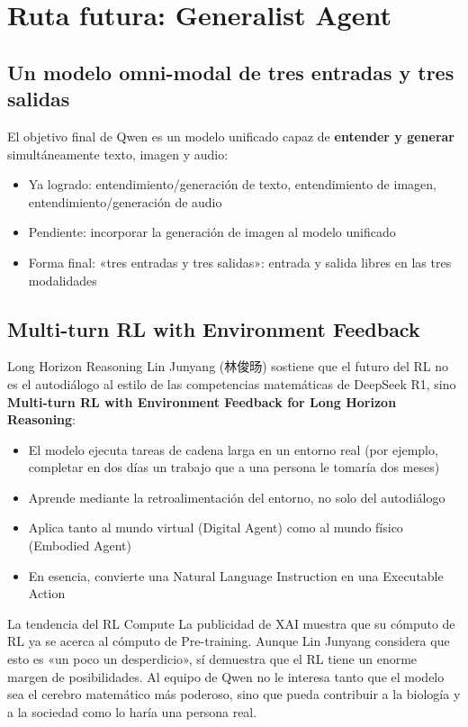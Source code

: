 \section{Ruta futura: Generalist Agent}

\subsection{Un modelo omni-modal de tres entradas y tres salidas}

El objetivo final de Qwen es un modelo unificado capaz de \textbf{entender y generar} simultáneamente texto, imagen y audio:

\begin{itemize}
    \item Ya logrado: entendimiento/generación de texto, entendimiento de imagen, entendimiento/generación de audio
    \item Pendiente: incorporar la generación de imagen al modelo unificado
    \item Forma final: «tres entradas y tres salidas»: entrada y salida libres en las tres modalidades
\end{itemize}

\subsection{Multi-turn RL with Environment Feedback}

\begin{importantbox}{Long Horizon Reasoning}
Lin Junyang (林俊旸) sostiene que el futuro del RL no es el autodiálogo al estilo de las competencias matemáticas de DeepSeek R1, sino \textbf{Multi-turn RL with Environment Feedback for Long Horizon Reasoning}:
\begin{itemize}
    \item El modelo ejecuta tareas de cadena larga en un entorno real (por ejemplo, completar en dos días un trabajo que a una persona le tomaría dos meses)
    \item Aprende mediante la retroalimentación del entorno, no solo del autodiálogo
    \item Aplica tanto al mundo virtual (Digital Agent) como al mundo físico (Embodied Agent)
    \item En esencia, convierte una Natural Language Instruction en una Executable Action
\end{itemize}
\end{importantbox}

\begin{knowledgebox}{La tendencia del RL Compute}
La publicidad de XAI muestra que su cómputo de RL ya se acerca al cómputo de Pre-training. Aunque Lin Junyang considera que esto es «un poco un desperdicio», sí demuestra que el RL tiene un enorme margen de posibilidades. Al equipo de Qwen no le interesa tanto que el modelo sea el cerebro matemático más poderoso, sino que pueda contribuir a la biología y a la sociedad como lo haría una persona real.
\end{knowledgebox}


